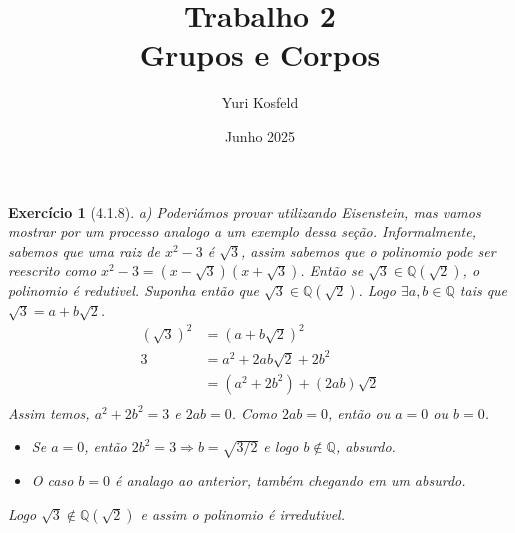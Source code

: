 \documentclass{article}
\title{Trabalho 2 \\ \large Grupos e Corpos}
\author{Yuri Kosfeld}
\date{Junho 2025}
\newtheorem*{ex}{Exercício}
\begin{document}
\maketitle

\begin{ex}[4.1.8]
    a) Poderiámos provar utilizando Eisenstein, mas vamos mostrar por um processo analogo a um exemplo dessa seção.
    Informalmente, sabemos que uma raiz de $x^2 -3$ é $\sqrt{3}$, assim sabemos que o polinomio pode ser reescrito como 
    $x^2 -3 = (x - \sqrt{3})(x + \sqrt{3})$. Então se $\sqrt{3} \in \mathbb{Q}(\sqrt{2})$, o polinomio é redutivel.
    Suponha então que $\sqrt{3} \in \mathbb{Q}(\sqrt{2})$. Logo $\exists a, b \in \mathbb{Q}$ tais que $\sqrt{3} = a + b\sqrt{2}$.
    \begin{align*}
        (\sqrt{3})^2 &= (a + b\sqrt{2})^2 \\
        3 &= a^2 + 2ab\sqrt{2} + 2b^2 \\
        &= (a^2 + 2b^2) + (2ab)\sqrt{2}\\
    \end{align*}
    Assim temos, $a^2 + 2b^2 = 3$ e $2ab = 0$.
    Como $2ab = 0$, então ou $a = 0$ ou $b = 0$.
    \begin{itemize}
        \item Se $a = 0$, então $2b^2 = 3 \Rightarrow b = \sqrt{3/2}$ e logo $b \notin \mathbb{Q}$, absurdo.
        \item O caso $b = 0$ é analago ao anterior, também chegando em um absurdo. 
    \end{itemize}
    Logo $\sqrt{3} \notin \mathbb{Q}(\sqrt{2})$ e assim o polinomio é irredutivel.
\end{ex}
\end{document}
